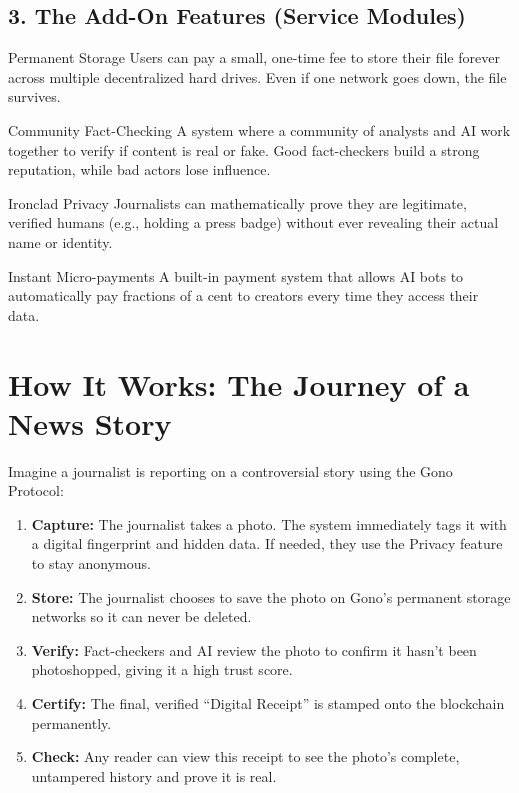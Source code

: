\documentclass[12pt, a4paper]{article}
\begin{document}
\subsection{3. The Add-On Features (Service Modules)}

\begin{benefitbox}{Permanent Storage}
    Users can pay a small, one-time fee to store their file forever across multiple decentralized hard drives. Even if one network goes down, the file survives.
\end{benefitbox}

\begin{benefitbox}{Community Fact-Checking}
    A system where a community of analysts and AI work together to verify if content is real or fake. Good fact-checkers build a strong reputation, while bad actors lose influence.
\end{benefitbox}

\begin{benefitbox}{Ironclad Privacy}
    Journalists can mathematically prove they are legitimate, verified humans (e.g., holding a press badge) without ever revealing their actual name or identity.
\end{benefitbox}

\begin{benefitbox}{Instant Micro-payments}
    A built-in payment system that allows AI bots to automatically pay fractions of a cent to creators every time they access their data.
\end{benefitbox}

\section{How It Works: The Journey of a News Story}

Imagine a journalist is reporting on a controversial story using the Gono Protocol:

\begin{enumerate}[leftmargin=*]
    \item \textbf{Capture:} The journalist takes a photo. The system immediately tags it with a digital fingerprint and hidden data. If needed, they use the Privacy feature to stay anonymous.
    \item \textbf{Store:} The journalist chooses to save the photo on Gono's permanent storage networks so it can never be deleted.
    \item \textbf{Verify:} Fact-checkers and AI review the photo to confirm it hasn't been photoshopped, giving it a high trust score.
    \item \textbf{Certify:} The final, verified ``Digital Receipt'' is stamped onto the blockchain permanently.
    \item \textbf{Check:} Any reader can view this receipt to see the photo's complete, untampered history and prove it is real.
\end{enumerate}
\end{document}
